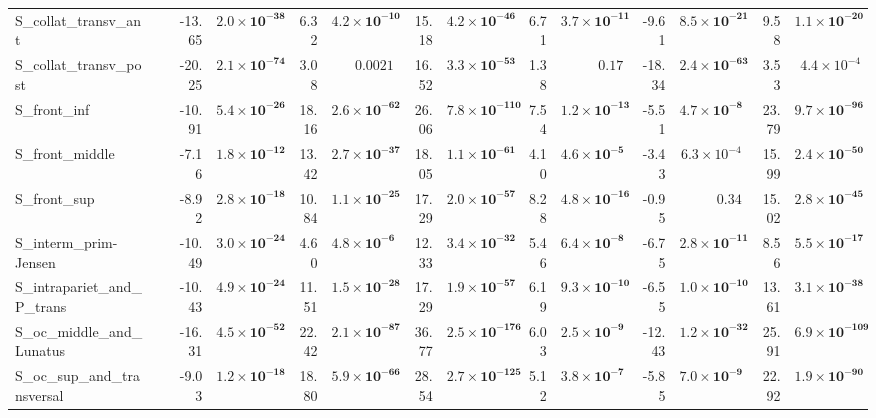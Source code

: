 {\begin{longtable}{llrrrrrrrrrrrr}
S\_collat\_transv\_ant &  & -13.65 & $\mathbf{2.0{\times}10^{-38}}$ & 6.32 & $\mathbf{4.2{\times}10^{-10}}$ & 15.18 & $\mathbf{4.2{\times}10^{-46}}$ & 6.71 & $\mathbf{3.7{\times}10^{-11}}$ & -9.61 & $\mathbf{8.5{\times}10^{-21}}$ & 9.58 & $\mathbf{1.1{\times}10^{-20}}$ \\
S\_collat\_transv\_post &  & -20.25 & $\mathbf{2.1{\times}10^{-74}}$ & 3.08 & $0.0021$ & 16.52 & $\mathbf{3.3{\times}10^{-53}}$ & 1.38 & $0.17$ & -18.34 & $\mathbf{2.4{\times}10^{-63}}$ & 3.53 & $4.4{\times}10^{-4}$ \\
S\_front\_inf &  & -10.91 & $\mathbf{5.4{\times}10^{-26}}$ & 18.16 & $\mathbf{2.6{\times}10^{-62}}$ & 26.06 & $\mathbf{7.8{\times}10^{-110}}$ & 7.54 & $\mathbf{1.2{\times}10^{-13}}$ & -5.51 & $\mathbf{4.7{\times}10^{-8}}$ & 23.79 & $\mathbf{9.7{\times}10^{-96}}$ \\
S\_front\_middle &  & -7.16 & $\mathbf{1.8{\times}10^{-12}}$ & 13.42 & $\mathbf{2.7{\times}10^{-37}}$ & 18.05 & $\mathbf{1.1{\times}10^{-61}}$ & 4.10 & $\mathbf{4.6{\times}10^{-5}}$ & -3.43 & $6.3{\times}10^{-4}$ & 15.99 & $\mathbf{2.4{\times}10^{-50}}$ \\
S\_front\_sup &  & -8.92 & $\mathbf{2.8{\times}10^{-18}}$ & 10.84 & $\mathbf{1.1{\times}10^{-25}}$ & 17.29 & $\mathbf{2.0{\times}10^{-57}}$ & 8.28 & $\mathbf{4.8{\times}10^{-16}}$ & -0.95 & $0.34$ & 15.02 & $\mathbf{2.8{\times}10^{-45}}$ \\
S\_interm\_prim-Jensen &  & -10.49 & $\mathbf{3.0{\times}10^{-24}}$ & 4.60 & $\mathbf{4.8{\times}10^{-6}}$ & 12.33 & $\mathbf{3.4{\times}10^{-32}}$ & 5.46 & $\mathbf{6.4{\times}10^{-8}}$ & -6.75 & $\mathbf{2.8{\times}10^{-11}}$ & 8.56 & $\mathbf{5.5{\times}10^{-17}}$ \\
S\_intrapariet\_and\_P\_trans &  & -10.43 & $\mathbf{4.9{\times}10^{-24}}$ & 11.51 & $\mathbf{1.5{\times}10^{-28}}$ & 17.29 & $\mathbf{1.9{\times}10^{-57}}$ & 6.19 & $\mathbf{9.3{\times}10^{-10}}$ & -6.55 & $\mathbf{1.0{\times}10^{-10}}$ & 13.61 & $\mathbf{3.1{\times}10^{-38}}$ \\
S\_oc\_middle\_and\_Lunatus &  & -16.31 & $\mathbf{4.5{\times}10^{-52}}$ & 22.42 & $\mathbf{2.1{\times}10^{-87}}$ & 36.77 & $\mathbf{2.5{\times}10^{-176}}$ & 6.03 & $\mathbf{2.5{\times}10^{-9}}$ & -12.43 & $\mathbf{1.2{\times}10^{-32}}$ & 25.91 & $\mathbf{6.9{\times}10^{-109}}$ \\
S\_oc\_sup\_and\_transversal &  & -9.03 & $\mathbf{1.2{\times}10^{-18}}$ & 18.80 & $\mathbf{5.9{\times}10^{-66}}$ & 28.54 & $\mathbf{2.7{\times}10^{-125}}$ & 5.12 & $\mathbf{3.8{\times}10^{-7}}$ & -5.85 & $\mathbf{7.0{\times}10^{-9}}$ & 22.92 & $\mathbf{1.9{\times}10^{-90}}$ \\

\end{longtable}}
